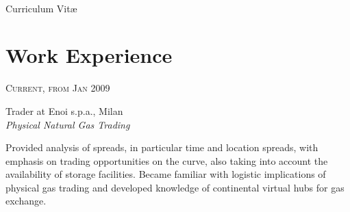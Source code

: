 \documentclass[10pt]{article} %
\begin{document}
\color{text1} %


\par{\\ %
{\color{headings} Curriculum
  {Vit\ae}\\[15pt]\par} %
	

\begin{minipage}[t]{0.5\textwidth} %
\vspace{0pt} %
	

\section{Work Experience} 


{\raggedleft\textsc{Current, from Jan 2009}\par}

{\raggedright\large Trader at Enoi s.p.a., Milan\\
\textit{Physical Natural Gas Trading}\\[5pt]}

\normalsize{Provided analysis of spreads, in particular time and location spreads, with emphasis on trading opportunities on the curve, also taking into account the availability of storage facilities. Became familiar with logistic implications of physical gas trading and developed knowledge of continental virtual hubs for gas exchange.}\\



\end{minipage}}
\end{document}
